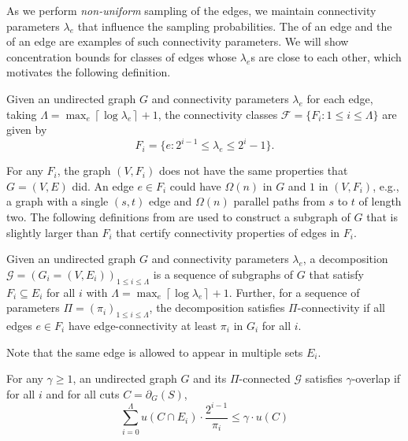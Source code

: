 \documentclass[11pt,a4paper]{article}
\begin{document}
As we perform \emph{non-uniform} sampling of the edges, we maintain connectivity parameters $\lambda_e$ that influence the sampling probabilities.
The \niindex of an edge and the \edgeconnectivity of an edge are examples of such connectivity parameters.
We will show concentration bounds for classes of edges whose $\lambda_e$s are close to each other, which motivates the following definition.

\begin{definition}
\label{def:connectivityclass}
Given an undirected graph $G$ and connectivity parameters $\lambda_e$ for each edge, taking $\Lambda = \max_e \left\lceil \log \lambda_e  \right\rceil + 1$,
the connectivity classes $\mathcal F = \{ F_i: 1 \le i \le \Lambda \}$ are given by
\[
    F_i = \{ e : 2^{i-1} \le \lambda_e \le 2^i-1 \}.
\]
\end{definition}

For any \connectivityclass $F_i$, the graph $(V, F_i)$ does not have the same \edgeconnectivity properties that $G = (V, E)$ did. An edge $e \in F_i$ could have \edgeconnectivity $\Omega(n)$ in $G$ and $1$ in $(V, F_i)$, e.g., a graph with a single $(s,t)$ edge and $\Omega(n)$ parallel paths from $s$ to $t$ of length two. The following definitions from \cite{FHHP19sparsification} are used to construct a subgraph of $G$ that is slightly larger than $F_i$ that certify connectivity properties of edges in $F_i$.

\begin{definition}
\label{def:decomposition}
Given an undirected graph $G$ and connectivity parameters $\lambda_e$, a decomposition $\mathcal G = \left( G_i = (V, E_i) \right)_{1 \le i \le \Lambda}$ is a sequence of subgraphs of $G$ that satisfy $F_i \subseteq E_i$ for all $i$ with $\Lambda = \max_e \left\lceil \log \lambda_e \right\rceil + 1$.
\label{def:piconnectivity}
Further, for a sequence of parameters $\Pi = \left( \pi_i \right)_{1 \le i \le \Lambda}$,
the decomposition satisfies $\Pi$-connectivity if
all edges $e \in F_i$ have edge-connectivity at least $\pi_i$ in $G_i$ for all $i$.
\end{definition}

Note that the same edge is allowed to appear in multiple sets $E_i$.

\begin{definition}
\label{def:gammaoverlap}
For any $\gamma \ge 1$,
an undirected graph $G$ and its $\Pi$-connected \decomposition $\mathcal G$ satisfies $\gamma$-overlap
if for all $i$ and for all cuts $C = \partial_{G}(S)$,
\[
\sum_{i = 0}^\Lambda u(C \cap E_i) \cdot \frac{2^{i-1}}{\pi_i} \le \gamma \cdot u(C)
\]
\end{definition}
\end{document}
